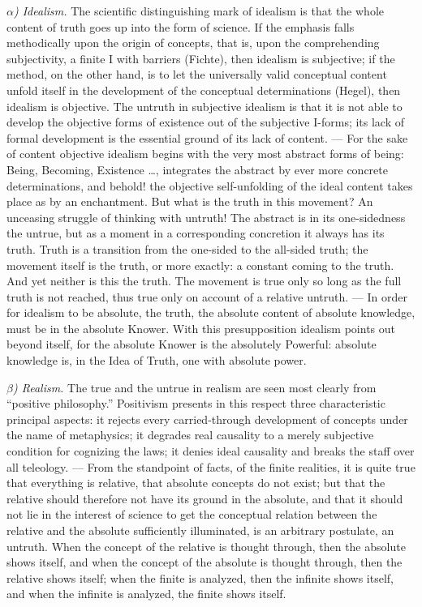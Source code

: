\documentclass[12pt]{book}
\begin{document}
\emph{$\alpha$) Idealism.} The scientific distinguishing mark of idealism is that
the whole content of truth goes up into the form of science. If the emphasis falls
methodically upon the origin of concepts, that is, upon the comprehending
subjectivity, a finite I with barriers (Fichte), then idealism is subjective; if
the method, on the other hand, is to let the universally valid conceptual content
unfold itself in the development of the conceptual determinations (Hegel), then
idealism is objective. The untruth in subjective idealism is that it is not able to
develop the objective forms of existence out of the subjective I-forms; its lack of
formal development is the essential ground of its lack of content. --- For the sake
of content objective idealism begins with the very most abstract forms of being:
Being, Becoming, Existence \ldots, integrates the abstract by ever more concrete
determinations, and behold! the objective self-unfolding of the ideal content takes
place as by an enchantment. But what is the truth in this movement? An unceasing
struggle of thinking with untruth! The abstract is in its one-sidedness the
untrue, but as a moment in a corresponding concretion it always has its truth.
Truth is a transition from the one-sided to the all-sided truth; the movement
itself is the truth, or more exactly: a constant coming to the truth. And yet
neither is this the truth. The movement is true only so long as the full truth is
not reached, thus true only on account of a relative untruth. --- In order for
idealism to be absolute, the truth, the absolute content of absolute knowledge,
must be in the absolute Knower. With this presupposition idealism points out beyond
itself, for the absolute Knower is the absolutely Powerful: absolute knowledge is,
in the Idea of Truth, one with absolute power.

\emph{$\beta$) Realism.} The true and the untrue in realism are seen most clearly
from ``positive philosophy.'' Positivism presents in this respect three
characteristic principal aspects: it rejects every carried-through development of
concepts under the name of metaphysics; it degrades real causality to a merely
subjective condition for cognizing the laws; it denies ideal causality and breaks
the staff over all teleology. --- From the standpoint of facts, of the finite
realities, it is quite true that everything is relative, that absolute concepts do
not exist; but that the relative should therefore not have its ground in the
absolute, and that it should not lie in the interest of science to get the
conceptual relation between the relative and the absolute sufficiently illuminated,
is an arbitrary postulate, an untruth. When the concept of the relative is thought
through, then the absolute shows itself, and when the concept of the absolute is
thought through, then the relative shows itself; when the finite is analyzed, then
the infinite shows itself, and when the infinite is analyzed, the finite shows
itself.
\end{document}
